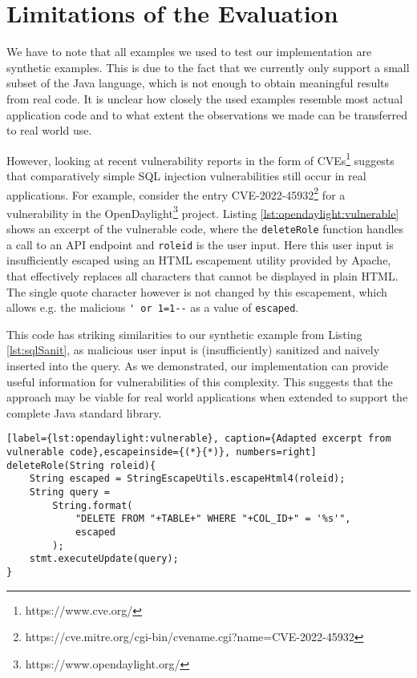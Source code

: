 \section{Limitations of the Evaluation}\label{sec:discussion:limitations}

We have to note that all examples we used to test our implementation are synthetic examples. This is due to the fact that we currently only support a small subset of the Java language, which is not enough to obtain meaningful results from real code. It is unclear how closely the used examples resemble most actual application code and to what extent the observations we made can be transferred to real world use.

However, looking at recent vulnerability reports in the form of CVEs\footnote{https://www.cve.org/} suggests that comparatively simple SQL injection vulnerabilities still occur in real applications. For example, consider the entry CVE-2022-45932\footnote{https://cve.mitre.org/cgi-bin/cvename.cgi?name=CVE-2022-45932} for a vulnerability in the OpenDaylight\footnote{https://www.opendaylight.org/} project.
Listing \ref{lst:opendaylight:vulnerable} shows an excerpt of the vulnerable code, where the \lstinline|deleteRole| function handles a call to an API endpoint and \lstinline|roleid| is the user input. Here this user input is insufficiently escaped using an HTML escapement utility provided by Apache, that effectively replaces all characters that cannot be displayed in plain HTML. The single quote character however is not changed by this escapement, which allows e.g. the malicious \lstinline|' or 1=1--| as a value of \lstinline|escaped|. 

This code has striking similarities to our synthetic example from Listing \ref{lst:sqlSanit}, as malicious user input is (insufficiently) sanitized and naively inserted into the query. As we demonstrated, our implementation can provide useful information for vulnerabilities of this complexity. This suggests that the approach may be viable for real world applications when extended to support the complete Java standard library.

\begin{lstlisting}[label={lst:opendaylight:vulnerable}, caption={Adapted excerpt from vulnerable code},escapeinside={(*}{*)}, numbers=right]
deleteRole(String roleid){
	String escaped = StringEscapeUtils.escapeHtml4(roleid);
	String query = 
		String.format(
			"DELETE FROM "+TABLE+" WHERE "+COL_ID+" = '%s'", 
			escaped
		);
	stmt.executeUpdate(query);
}       
\end{lstlisting}

